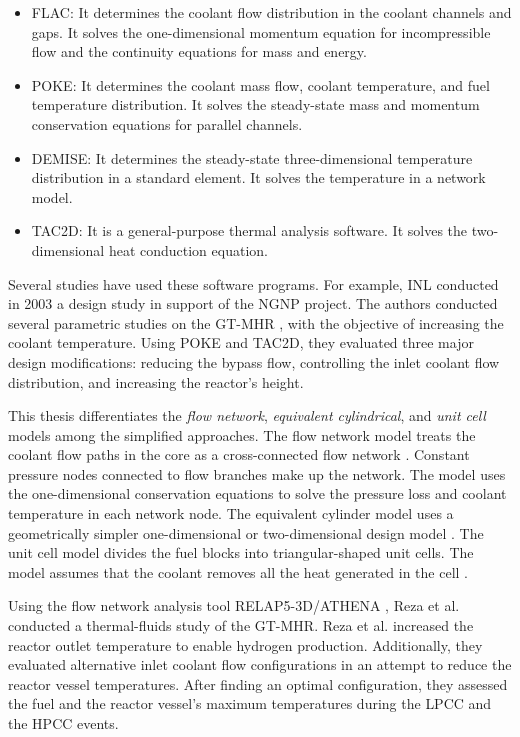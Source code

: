 \begin{itemize}
\item FLAC: It determines the coolant flow distribution in the coolant channels and gaps.
It solves the one-dimensional momentum equation for incompressible flow and the continuity equations for mass and energy.

\item POKE: It determines the coolant mass flow, coolant temperature, and fuel temperature distribution.
It solves the steady-state mass and momentum conservation equations for parallel channels.

\item DEMISE: It determines the steady-state three-dimensional temperature distribution in a standard element.
It solves the temperature in a network model.

\item TAC2D: It is a general-purpose thermal analysis software.
It solves the two-dimensional heat conduction equation.
\end{itemize}

Several studies have used these software programs.
For example, \gls{INL} conducted in 2003 a design study \cite{macdonald_ngnp_2003} in support of the \gls{NGNP} project.
The authors conducted several parametric studies on the GT-MHR \cite{general_atomics_gas_1996}, with the objective of increasing the coolant temperature.
Using POKE and TAC2D, they evaluated three major design modifications: reducing the bypass flow, controlling the inlet coolant flow distribution, and increasing the reactor's height.

This thesis differentiates the \textit{flow network}, \textit{equivalent cylindrical}, and \textit{unit cell} models among the simplified approaches.
The flow network model treats the coolant flow paths in the core as a cross-connected flow network \cite{shenoy_htgr_1974}.
Constant pressure nodes connected to flow branches make up the network.
The model uses the one-dimensional conservation equations to solve the pressure loss and coolant temperature in each network node.
The equivalent cylinder model uses a geometrically simpler one-dimensional or two-dimensional design model \cite{shenoy_htgr_1974}\cite{tak_numerical_2008}.
The unit cell model divides the fuel blocks into triangular-shaped unit cells.
The model assumes that the coolant removes all the heat generated in the cell \cite{tak_numerical_2008}.

Using the flow network analysis tool RELAP5-3D/ATHENA \cite{inl_relap5-3dathena_2005}, Reza et al. \cite{reza_design_2006} conducted a thermal-fluids study of the GT-MHR.
Reza et al. increased the reactor outlet temperature to enable hydrogen production.
Additionally, they evaluated alternative inlet coolant flow configurations in an attempt to reduce the reactor vessel temperatures.
After finding an optimal configuration, they assessed the fuel and the reactor vessel's maximum temperatures during the \gls{LPCC} and the \gls{HPCC} events.

